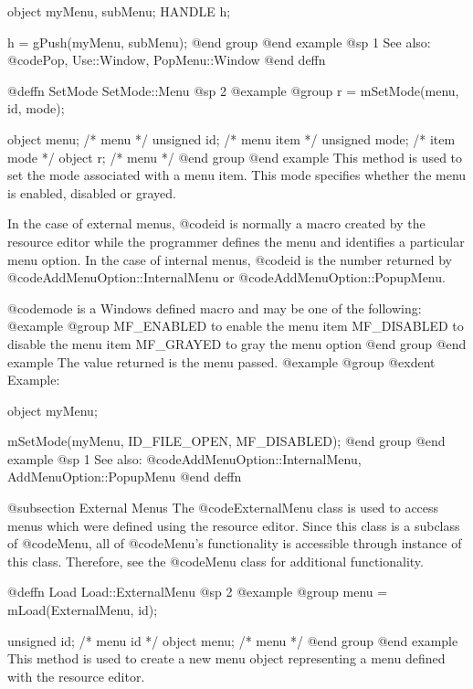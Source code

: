 object  myMenu, subMenu;
HANDLE  h;

h = gPush(myMenu, subMenu);
@end group
@end example
@sp 1
See also:  @code{Pop, Use::Window, PopMenu::Window}
@end deffn








@deffn {SetMode} SetMode::Menu
@sp 2
@example
@group
r = mSetMode(menu, id, mode);

object  menu;   /*  menu       */
unsigned  id;   /*  menu item  */
unsigned  mode; /*  item mode  */
object    r;    /*  menu       */
@end group
@end example
This method is used to set the mode associated with a menu item.  This
mode specifies whether the menu is enabled, disabled or grayed.

In the case of external menus, @code{id} is normally a macro created by
the resource editor while the programmer defines the menu and identifies
a particular menu option.  In the case of internal menus, @code{id}
is the number returned by @code{AddMenuOption::InternalMenu} or
@code{AddMenuOption::PopupMenu}.

@code{mode} is a Windows defined macro and may be one of the following:
@example
@group
MF_ENABLED      to enable the menu item
MF_DISABLED     to disable the menu item
MF_GRAYED       to gray the menu option
@end group
@end example
The value returned is the menu passed.
@example
@group
@exdent Example:

object  myMenu;

mSetMode(myMenu, ID_FILE_OPEN, MF_DISABLED);
@end group
@end example
@sp 1
See also:  @code{AddMenuOption::InternalMenu, AddMenuOption::PopupMenu}
@end deffn






@subsection External Menus
The @code{ExternalMenu} class is used to access menus which were defined
using the resource editor.  Since this class is a subclass of @code{Menu},
all of @code{Menu}'s functionality is accessible through instance of this
class.  Therefore, see the @code{Menu} class for additional functionality.







@deffn {Load} Load::ExternalMenu
@sp 2
@example
@group
menu = mLoad(ExternalMenu, id);

unsigned  id;   /*  menu id  */
object  menu;   /*  menu     */
@end group
@end example
This method is used to create a new menu object representing a menu defined
with the resource editor.

